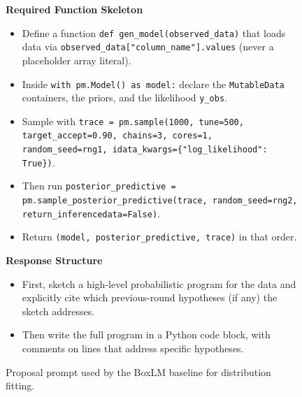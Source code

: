 \documentclass{article}
\begin{document}
\begin{figure}[h]
\begin{mdframed}[linecolor=gray!50, backgroundcolor=gray!5, linewidth=0.8pt]
\medskip
\textbf{Required Function Skeleton}
\begin{itemize}[leftmargin=*, nosep]
    \item Define a function \texttt{def gen\_model(observed\_data)} that
          loads data via \texttt{observed\_data["column\_name"].values}
          (never a placeholder array literal).
    \item Inside \texttt{with pm.Model() as model:} declare the
          \texttt{MutableData} containers, the priors, and the likelihood
          \texttt{y\_obs}.
    \item Sample with
          \texttt{trace = pm.sample(1000, tune=500, target\_accept=0.90,
          chains=3, cores=1, random\_seed=rng1,
          idata\_kwargs=\{"log\_likelihood": True\})}.
    \item Then run \texttt{posterior\_predictive =
          pm.sample\_posterior\_predictive(trace, random\_seed=rng2,
          return\_inferencedata=False)}.
    \item Return \texttt{(model, posterior\_predictive, trace)} in that
          order.
\end{itemize}

\medskip
\textbf{Response Structure}
\begin{itemize}[leftmargin=*, nosep]
    \item First, sketch a high-level probabilistic program for the data and
          explicitly cite which previous-round hypotheses (if any) the
          sketch addresses.
    \item Then write the full program in a Python code block, with comments
          on lines that address specific hypotheses.
\end{itemize}

\end{mdframed}
\caption{Proposal prompt used by the BoxLM baseline for distribution fitting.}
\label{fig:boxlm-proposal-distribution-fitting-prompt}
\end{figure}
\end{document}
